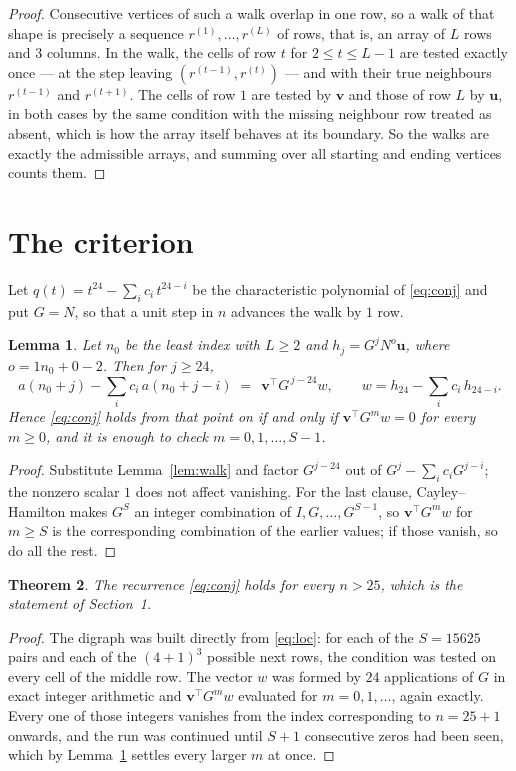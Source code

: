 \documentclass[11pt,a4paper]{article}
\theoremstyle{plain}
\newtheorem{theorem}{Theorem}
\newtheorem{lemma}[theorem]{Lemma}
\theoremstyle{definition}
\begin{document}
\begin{proof}
Consecutive vertices of such a walk overlap in one row, so a walk of that shape is
precisely a sequence $r^{(1)},\dots,r^{(L)}$ of rows, that is, an array of $L$ rows
and $3$ columns. In the walk, the cells of row $t$ for $2\le t\le L-1$ are tested
exactly once --- at the step leaving $(r^{(t-1)},r^{(t)})$ --- and with their true
neighbours $r^{(t-1)}$ and $r^{(t+1)}$. The cells of row $1$ are tested by
$\mathbf{v}$ and those of row $L$ by $\mathbf{u}$, in both cases by the same condition
with the missing neighbour row treated as absent, which is how the array itself behaves at
its boundary. So the walks are exactly the admissible arrays, and summing over all starting
and ending vertices counts them.
\end{proof}

\section{The criterion}

Let $q(t)=t^{24}-\sum_i c_i\,t^{24-i}$ be the characteristic polynomial of
\eqref{eq:conj} and put $G=N$, so that a unit step in $n$ advances the walk by
$1$ row.

\begin{lemma}\label{lem:crit}
Let $n_0$ be the least index with $L\ge2$ and $h_j=G^{j}N^{o}\mathbf{u}$, where
$o=1n_0+0-2$. Then for $j\ge24$,
\[
a(n_0+j)-\sum_i c_i\,a(n_0+j-i)\;=\;\,\mathbf{v}^{\!\top}G^{\,j-24}w,
\qquad w=h_{24}-\sum_i c_i\,h_{24-i} .
\]
Hence \eqref{eq:conj} holds from that point on if and only if
$\mathbf{v}^{\!\top}G^{m}w=0$ for every $m\ge0$, and it is enough to check
$m=0,1,\dots,S-1$.
\end{lemma}

\begin{proof}
Substitute Lemma~\ref{lem:walk} and factor $G^{j-24}$ out of
$G^{j}-\sum_ic_iG^{j-i}$; the nonzero scalar $1$ does not affect
vanishing. For the last clause, Cayley--Hamilton makes $G^{S}$ an integer combination of
$I,G,\dots,G^{S-1}$, so $\mathbf{v}^{\!\top}G^{m}w$ for $m\ge S$ is the corresponding
combination of the earlier values; if those vanish, so do all the rest.
\end{proof}

\begin{theorem}
The recurrence \eqref{eq:conj} holds for every $n>25$, which is the statement of
Section~1.
\end{theorem}

\begin{proof}
The digraph was built directly from \eqref{eq:loc}: for each of the $S=15625$ pairs and each
of the $(4+1)^{3}$ possible next rows, the condition was tested on every cell of
the middle row. The vector $w$ was formed by $24$ applications of $G$ in exact integer
arithmetic and $\mathbf{v}^{\!\top}G^{m}w$ evaluated for $m=0,1,\dots$, again exactly.
Every one of those integers vanishes from the index corresponding to $n=25+1$ onwards,
and the run was continued until $S+1$ consecutive zeros had been seen, which by
Lemma~\ref{lem:crit} settles every larger $m$ at once.
\end{proof}
\end{document}
